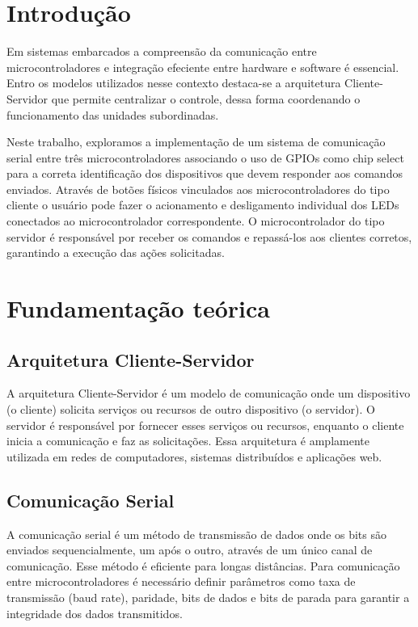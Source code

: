 \documentclass[12pt, a4paper]{article}
\begin{document}
\section{Introdução}
Em sistemas embarcados a compreensão da comunicação entre microcontroladores e integração efeciente entre hardware e software é essencial. Entro os modelos utilizados nesse contexto destaca-se a arquitetura Cliente-Servidor que permite centralizar o controle, dessa forma coordenando o funcionamento das unidades subordinadas.

Neste trabalho, exploramos a implementação de um sistema de comunicação serial entre três microcontroladores associando o uso de GPIOs como chip select para a correta identificação dos dispositivos que devem responder aos comandos enviados. Através de botões físicos vinculados aos microcontroladores do tipo cliente o usuário pode fazer o acionamento e desligamento individual dos LEDs conectados ao microcontrolador correspondente. O microcontrolador do tipo servidor é responsável por receber os comandos e repassá-los aos clientes corretos, garantindo a execução das ações solicitadas.

\newpage
\section{Fundamentação teórica}
\subsection{Arquitetura Cliente-Servidor}
A arquitetura Cliente-Servidor é um modelo de comunicação onde um dispositivo (o cliente) solicita serviços ou recursos de outro dispositivo (o servidor). O servidor é responsável por fornecer esses serviços ou recursos, enquanto o cliente inicia a comunicação e faz as solicitações. Essa arquitetura é amplamente utilizada em redes de computadores, sistemas distribuídos e aplicações web.
\subsection{Comunicação Serial}
A comunicação serial é um método de transmissão de dados onde os bits são enviados sequencialmente, um após o outro, através de um único canal de comunicação. Esse método é eficiente para longas distâncias. Para comunicação entre microcontroladores é necessário definir parâmetros como taxa de transmissão (baud rate), paridade, bits de dados e bits de parada para garantir a integridade dos dados transmitidos.
\end{document}
